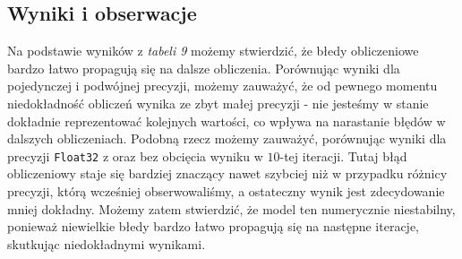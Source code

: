 \documentclass[12pt]{article}
\begin{document}
    \subsection*{Wyniki i obserwacje}
        Na podstawie wyników z \textit{tabeli 9} możemy stwierdzić, że błedy obliczeniowe bardzo łatwo propagują się na dalsze obliczenia.
        \newline
        Porównując wyniki dla pojedynczej i podwójnej precyzji, możemy zauważyć, że od pewnego momentu niedokładność obliczeń wynika ze zbyt małej precyzji - nie jesteśmy w stanie dokładnie reprezentować kolejnych wartości, co wpływa na narastanie błędów w dalszych obliczeniach.
        \newline
        Podobną rzecz możemy zauważyć, porównując wyniki dla precyzji \texttt{Float32} z oraz bez obcięcia wyniku w $10$-tej iteracji. Tutaj błąd obliczeniowy staje się bardziej znaczący nawet szybciej niż w przypadku różnicy precyzji, którą wcześniej obserwowaliśmy, a ostateczny wynik jest zdecydowanie mniej dokładny.
        \newline
        Możemy zatem stwierdzić, że model ten numerycznie niestabilny, ponieważ niewielkie błedy bardzo łatwo propagują się na następne iteracje, skutkując niedokładnymi wynikami.

        \newpage
\end{document}
